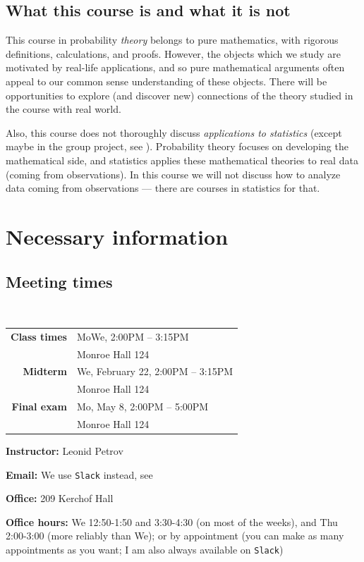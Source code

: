 \documentclass[oneside,11pt]{amsart}
\begin{document}
\subsection*{What this course is and what it is not}

This course in probability \emph{theory} belongs to pure mathematics, with
rigorous definitions, calculations, and proofs. However, the objects which we
study are motivated by real-life applications, and so pure mathematical
arguments often appeal to our common sense understanding of these objects.
There will be opportunities to explore (and discover new) connections of the
theory studied in the course with real world.

Also, this course does not thoroughly discuss \emph{applications to statistics}
(except maybe in the group project, see ).  Probability
theory focuses on developing the mathematical side, and statistics applies
these mathematical theories to real data (coming from observations). In this
course we will not discuss how to analyze data coming from observations ---
there are courses in statistics for that.

\section{Necessary information}

\subsection{Meeting times}{\ }\\

\begin{tabular}{|r|l|}
	\hline
	\textbf{Class times}  & MoWe, 2:00PM -- 3:15PM
                       \\  & Monroe Hall 124
                       \\ \hline
	\textbf{Midterm}   & We, February 22, 2:00PM -- 3:15PM
                       \\  & Monroe Hall 124
                       \\ \hline
	\textbf{Final exam}   & Mo, May 8, 2:00PM -- 5:00PM
                       \\  & Monroe Hall 124
                       \\ \hline
\end{tabular}
\hspace{10pt}\parbox{.42\textwidth}
{

	\textbf{Instructor:} Leonid Petrov

	\textbf{Email:} We use \texttt{Slack} instead, see 

	\textbf{Office:} 209 Kerchof Hall

	\textbf{Office hours:} We 12:50-1:50 and 3:30-4:30 (on most of the weeks),
	and Thu 2:00-3:00 (more reliably than We);
	or by appointment (you can make as many appointments as you want;
	I am also always available on \texttt{Slack})
}
\end{document}
